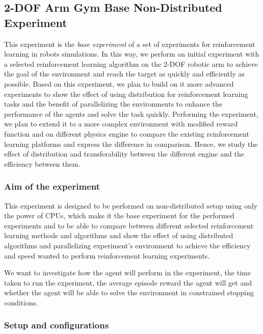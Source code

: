 
\subsection{2-DOF Arm Gym Base Non-Distributed Experiment}

This experiment is the \textit{base experiment} of a set of experiments for reinforcement learning in robots simulations. In this way, we perform an initial experiment with a selected reinforcement learning algorithm on the 2-DOF robotic arm to achieve the goal of the environment and reach the target as quickly and efficiently as possible. Based on this experiment, we plan to build on it more advanced experiments to show the effect of using distribution for reinforcement learning tasks and the benefit of parallelizing the environments to enhance the performance of the agents and solve the task quickly. Performing the experiment, we plan to extend it to a more complex environment with modified reward function and on different physics engine to compare the existing reinforcement learning platforms and express the difference in comparison. Hence, we study the effect of distribution and transferability between the different engine and the efficiency between them.

\subsubsection{Aim of the experiment}

This experiment is designed to be performed on non-distributed setup using only the power of CPUs, which make it the base experiment for the performed experiments and to be able to compare between different selected reinforcement learning methods and algorithms and show the effect of using distributed algorithms and parallelizing experiment's environment to achieve the efficiency and speed wanted to perform reinforcement learning experiments. 

We want to investigate how the agent will perform in the experiment, the time taken to run the experiment, the average episode reward the agent will get and whether the agent will be able to solve the environment in constrained stopping conditions.

\subsubsection{Setup and configurations}

